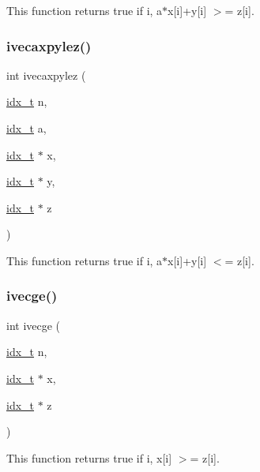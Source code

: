 This function returns true if  i, a$\ast$x\mbox{[}i\mbox{]}+y\mbox{[}i\mbox{]} $>$= z\mbox{[}i\mbox{]}. \mbox{\label{a00230_a7a81166f41883548c3db20188df00b72}} 
\subsubsection{\texorpdfstring{ivecaxpylez()}{ivecaxpylez()}}
{\footnotesize\ttfamily int ivecaxpylez (\begin{DoxyParamCaption}\item[{\hyperlink{a00876_aaa5262be3e700770163401acb0150f52}{idx\+\_\+t}}]{n,  }\item[{\hyperlink{a00876_aaa5262be3e700770163401acb0150f52}{idx\+\_\+t}}]{a,  }\item[{\hyperlink{a00876_aaa5262be3e700770163401acb0150f52}{idx\+\_\+t} $\ast$}]{x,  }\item[{\hyperlink{a00876_aaa5262be3e700770163401acb0150f52}{idx\+\_\+t} $\ast$}]{y,  }\item[{\hyperlink{a00876_aaa5262be3e700770163401acb0150f52}{idx\+\_\+t} $\ast$}]{z }\end{DoxyParamCaption})}

This function returns true if  i, a$\ast$x\mbox{[}i\mbox{]}+y\mbox{[}i\mbox{]} $<$= z\mbox{[}i\mbox{]}. \mbox{\label{a00230_a48a007c5755fd14628488b26f7db7201}} 
\subsubsection{\texorpdfstring{ivecge()}{ivecge()}}
{\footnotesize\ttfamily int ivecge (\begin{DoxyParamCaption}\item[{\hyperlink{a00876_aaa5262be3e700770163401acb0150f52}{idx\+\_\+t}}]{n,  }\item[{\hyperlink{a00876_aaa5262be3e700770163401acb0150f52}{idx\+\_\+t} $\ast$}]{x,  }\item[{\hyperlink{a00876_aaa5262be3e700770163401acb0150f52}{idx\+\_\+t} $\ast$}]{z }\end{DoxyParamCaption})}

This function returns true if  i, x\mbox{[}i\mbox{]} $>$= z\mbox{[}i\mbox{]}. \mbox{\label{a00230_a29ab1dff40529cc72ad264f548e5661b}} 
